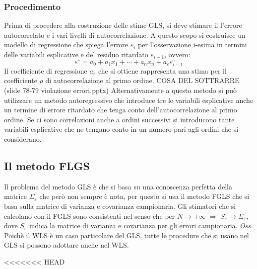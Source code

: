 \subsubsection{Procedimento}
Prima di procedere alla costruzione delle stime GLS,  si deve stimare il l'errore autocorrelato e i vari livelli di autocorrelazione. A questo scopo si costruisce un modello di regressione che spiega l'errore $\varepsilon_i$ per l'osservazione i-esima in termini delle variabili esplicative e del residuo ritardato $\varepsilon_{i-1}$, ovvero:
\begin{equation}
\varepsilon^\circ = a_0 + a_1x_1 + \cdots + a_n x_n + a_\varepsilon \varepsilon_{i-1}^\circ
\end{equation}
Il coefficiente di regressione $a_\varepsilon$ che si ottiene rappresenta una stima per il coefficiente $\rho$ di autocorrelazione al primo ordine.
COSA DEL SOTTRARRE (slide 78-79 violazione errori.pptx)
Alternativamente a questo metodo si può utilizzare un metodo autoregressivo che introduce tre le variabili esplicative anche un termine di errore ritardato che tenga conto dell'autocorrelazione al primo ordine. Se ci sono correlazioni anche a ordini successivi si introducono tante variabili esplicative che ne tengano conto in un numero pari agli ordini che si considerano.
\subsection{Il metodo FLGS}
Il problema del metodo GLS è che si basa su una conoscenza perfetta della matrice $\Sigma_\varepsilon$ che però non sempre è nota, per questo si usa il metodo FGLS che si basa sulla matrice di varianza e covarianza campionaria. Gli stimatori che si calcolano con il FGLS sono consistenti nel senso che per $N \rightarrow +\infty \; \Rightarrow \; S_\varepsilon \rightarrow \Sigma_\varepsilon$, dove $S_\varepsilon$ indica la matrice di varianza e covarianza per gli errori campionaria.
\textit{Oss.}\\
Poichè il WLS è un caso particolare del GLS, tutte le procedure che si usano nel GLS si possono adottare anche nel WLS. 

<<<<<<< HEAD
